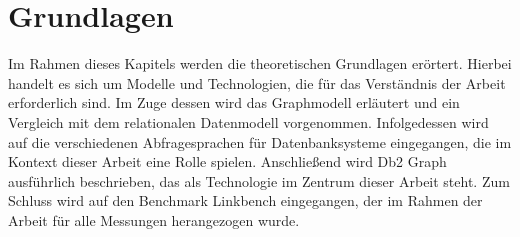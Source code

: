 \chapter{Grundlagen}
Im Rahmen dieses Kapitels werden die theoretischen Grundlagen erörtert. Hierbei handelt es sich um Modelle und Technologien, die für das Verständnis der Arbeit erforderlich sind. Im Zuge dessen wird das Graphmodell erläutert und ein Vergleich mit dem relationalen Datenmodell vorgenommen. Infolgedessen wird auf die verschiedenen Abfragesprachen für Datenbanksysteme eingegangen, die im Kontext dieser Arbeit eine Rolle spielen. Anschließend wird Db2 Graph ausführlich beschrieben, das als Technologie im Zentrum dieser Arbeit steht. Zum Schluss wird auf den Benchmark Linkbench eingegangen, der im Rahmen der Arbeit für alle Messungen herangezogen wurde.





